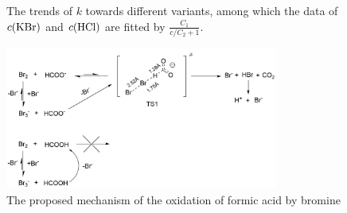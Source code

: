 \documentclass[%
preprint,
 amsmath,amssymb,
 aps,
10.5pt,
]{revtex4-1}
\begin{document}
\begin{figure}
\centering
{}
\caption{The trends of $k$ towards different variants, among which the data of $c(\ce{KBr})$ and $c(\ce{HCl})$ are fitted by $\frac{C_1}{c/C_2 + 1}$.}
\label{fit}
\end{figure}
\begin{figure}
\centering
\includegraphics[width=0.8\textwidth]{figures/reaction_mechanic.png}
\caption{The proposed mechanism of the oxidation of formic acid by bromine}
\label{mechanism}
\end{figure}
\end{document}

